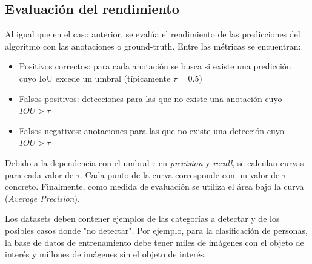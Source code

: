 \subsection{Evaluación del rendimiento}
Al igual que en el caso anterior, se evalúa el rendimiento de las predicciones del algoritmo con las anotaciones o ground-truth. Entre las métricas se encuentran:
\begin{itemize}
\item Positivos correctos: para cada anotación se busca si existe una predicción cuyo IoU excede un umbral (típicamente $\tau = 0.5$)
\item Falsos positivos: detecciones para las que no existe una anotación cuyo $IOU > \tau$
\item Falsos negativos: anotaciones para las que no existe una detección cuyo $IOU > \tau$
\end{itemize}

Debido a la dependencia con el umbral $\tau$ en \textit{precision} y \textit{recall}, se calculan curvas para cada valor de $\tau$. Cada punto de la curva corresponde con un valor de $\tau$ concreto. Finalmente, como medida de evaluación se utiliza el área bajo la curva (\textit{Average Precision}).

Los datasets deben contener ejemplos de las categorías a detectar y de los posibles casos donde "no detectar". Por ejemplo, para la clasificación de personas, la base de datos de entrenamiento debe tener miles de imágenes con el objeto de interés y millones de imágenes sin el objeto de interés. 

